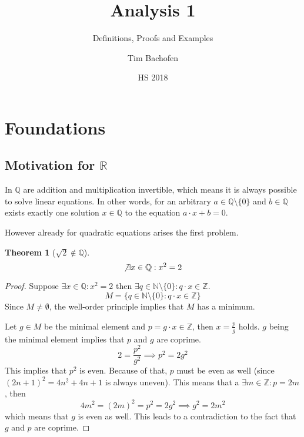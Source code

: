 \documentclass[english,titlepage]{uzhpub}
\theoremstyle{definition}
\theoremstyle{plain}
\newtheorem{theorem}[definition]{Theorem} %
\theoremstyle{remark}
\theoremstyle{example}
\begin{document}
   \title{Analysis 1}
   \subtitle{Definitions, Proofs and Examples}
   \author{Tim Bachofen}
   \date{HS 2018}

   \maketitle

   \tableofcontents
   \newpage

   \renewcommand{\listtheoremname}{List of Definitions}
   \listoftheorems[ignoreall, show={definition}]
   \newpage

   \renewcommand{\listtheoremname}{List of Statements}
   \listoftheorems[ignoreall, show={theorem,corollary,proposition,lemma}]
   \newpage

   \section{Foundations}
   \subsection{Motivation for \texorpdfstring{\(\mathbb{R}\)}{R}}
   In \(\mathbb{Q}\) are addition and multiplication invertible, which means it is always possible to solve linear equations.
   In other words, for an arbitrary \(a \in \mathbb{Q} \setminus \{0\}\) and \(b \in \mathbb{Q}\) exists exactly one solution \(x \in \mathbb{Q}\) to the equation \(a \cdot x + b = 0\).

   However already for quadratic equations arises the first problem.

   \begin{theorem}[\(\sqrt{2} \not\in \mathbb{Q}\)]
      \[\not\exists x \in \mathbb{Q}: x^2 = 2\]
   \end{theorem}
   \begin{proof}
      Suppose \(\exists x \in \mathbb{Q}: x^2 = 2\) then \(\exists q \in \mathbb{N} \setminus \{0\}: q \cdot x \in \mathbb{Z}\).
      \[M = \{q \in \mathbb{N}\setminus\{0\}: q \cdot x \in \mathbb{Z}\}\]
      Since \(M \neq \emptyset\), the well-order principle implies that \(M\) has a minimum.

      Let \(g \in M\) be the minimal element and \(p = g \cdot x \in \mathbb{Z}\), then \(x = \frac{p}{g}\) holds.
      \(g\) being the minimal element implies that \(p\) and \(g\) are coprime.
      \[2 = \frac{p^2}{g^2} \implies p^2 = 2 g^2\]
      This implies that \(p^2\) is even.
      Because of that, \(p\) must be even as well (since \((2n + 1)^2 = 4n^2 + 4n + 1\) is always uneven).
      This means that a \(\exists m \in \mathbb{Z}: p = 2m\), then
      \[4m^2 = (2m)^2 = p^2 = 2g^2 \implies g^2 = 2m^2\]
      which means that \(g\) is even as well.
      This leads to a contradiction to the fact that \(g\) and \(p\) are coprime.
   \end{proof}
\end{document}
